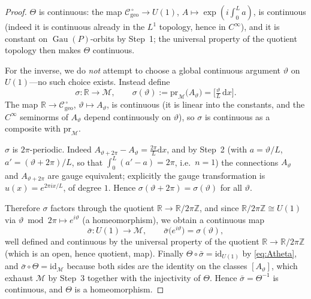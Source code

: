 \documentclass[11pt,a4paper]{article}
\theoremstyle{plain}
\theoremstyle{definition}
\theoremstyle{remark}
\newcommand{\Real}{\mathbb{R}}
\newcommand{\Int}{\mathbb{Z}}
\newcommand{\Cgeo}{\mathcal{C}_{\mathrm{geo}}}
\newcommand{\Gau}{\operatorname{Gau}}
\newcommand{\id}{\mathrm{id}}
\begin{document}
\begin{proof}
$\Theta$ is continuous: the map $\Cgeo^{\,\circ}\to U(1)$, $A\mapsto\exp(i\int_0^L a)$, is
continuous (indeed it is continuous already in the $L^1$ topology, hence in $C^\infty$), and it is
constant on $\Gau(P)$-orbits by Step~1; the universal property of the quotient topology then makes
$\Theta$ continuous.

For the inverse, we do \emph{not} attempt to choose a global continuous argument $\vartheta$ on
$U(1)$---no such choice exists. Instead define
\begin{equation}
\label{eq:sigma}
\sigma\colon\Real\longrightarrow\mathcal{M},
\qquad
\sigma(\vartheta):=\mathrm{pr}_{\mathcal{M}}\bigl(A_\vartheta\bigr)
=\bigl[\tfrac{\vartheta}{L}\,\mathrm{d}x\bigr] .
\end{equation}
The map $\Real\to\Cgeo^{\,\circ}$, $\vartheta\mapsto A_\vartheta$, is continuous (it is linear into
the constants, and the $C^\infty$ seminorms of $A_\vartheta$ depend continuously on $\vartheta$), so
$\sigma$ is continuous as a composite with $\mathrm{pr}_{\mathcal{M}}$.

$\sigma$ is $2\pi$-periodic. Indeed $A_{\vartheta+2\pi}-A_\vartheta=\tfrac{2\pi}{L}\mathrm{d}x$, and
by Step~2 (with $a=\vartheta/L$, $a'=(\vartheta+2\pi)/L$, so that $\int_0^L(a'-a)=2\pi$, i.e.\
$n=1$) the connections $A_\vartheta$ and $A_{\vartheta+2\pi}$ are gauge equivalent; explicitly the
gauge transformation is $u(x)=e^{2\pi i x/L}$, of degree $1$. Hence
$\sigma(\vartheta+2\pi)=\sigma(\vartheta)$ for all $\vartheta$.

Therefore $\sigma$ factors through the quotient $\Real\to\Real/2\pi\Int$, and since
$\Real/2\pi\Int\cong U(1)$ via $\vartheta\bmod 2\pi\mapsto e^{i\vartheta}$ (a homeomorphism), we
obtain a continuous map
\begin{equation}
\label{eq:sigma-bar}
\bar\sigma\colon U(1)\longrightarrow\mathcal{M},
\qquad
\bar\sigma\bigl(e^{i\vartheta}\bigr)=\sigma(\vartheta) ,
\end{equation}
well defined and continuous by the universal property of the quotient $\Real\to\Real/2\pi\Int$
(which is an open, hence quotient, map). Finally $\Theta\circ\bar\sigma=\id_{U(1)}$ by
\eqref{eq:Atheta}, and $\bar\sigma\circ\Theta=\id_{\mathcal{M}}$ because both sides are the identity
on the classes $[A_\vartheta]$, which exhaust $\mathcal{M}$ by Step~3 together with the injectivity
of $\Theta$. Hence $\bar\sigma=\Theta^{-1}$ is continuous, and $\Theta$ is a homeomorphism.
\end{proof}
\end{document}
